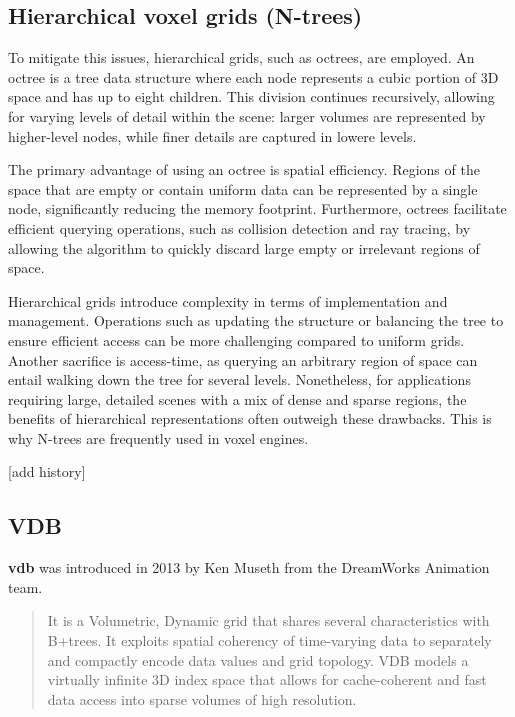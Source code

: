 \subsection{Hierarchical voxel grids (N-trees)}
To mitigate this issues, hierarchical grids, such as octrees, are employed. An octree is a tree data structure where each node represents a cubic portion of 3D space and has up to eight children. This division continues recursively, allowing for varying levels of detail within the scene: larger volumes are represented by higher-level nodes, while finer details are captured in lowere levels.

The primary advantage of using an octree is spatial efficiency. Regions of the space that are empty or contain uniform data can be represented by a single node, significantly reducing the memory footprint. Furthermore, octrees facilitate efficient querying operations, such as collision detection and ray tracing, by allowing the algorithm to quickly discard large empty or irrelevant regions of space.

Hierarchical grids introduce complexity in terms of implementation and management. Operations such as updating the structure or balancing the tree to ensure efficient access can be more challenging compared to uniform grids.
Another sacrifice is access-time, as querying an arbitrary region of space can entail walking down the tree for several levels.
Nonetheless, for applications requiring large, detailed scenes with a mix of dense and sparse regions, the benefits of hierarchical representations often outweigh these drawbacks. This is why N-trees are frequently used in voxel engines.

[add history]

\subsection{VDB}

\textbf{\acrshort{vdb}} was introduced in 2013 by Ken Museth\supercite{vdb2013} from the DreamWorks Animation team.
\begin{quote}
It is a Volumetric, Dynamic grid that shares several characteristics with B+trees.
It exploits spatial coherency of time-varying data to separately and compactly encode data values and grid topology.
VDB models a virtually infinite 3D index space that allows for cache-coherent and fast data access into sparse volumes of high resolution.
\end{quote}


